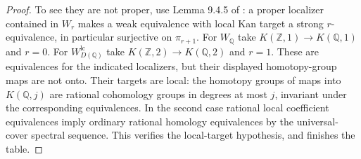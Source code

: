 \begin{proof}
To see they are not proper, use Lemma 9.4.5 of \citet{RCisinski2006}: a proper localizer contained in $W_r$ makes a weak equivalence with local Kan target a strong $r$-equivalence, in particular surjective on $\pi_{r+1}$. For $W_{\mathbb Q}$ take $K(\mathbb Z,1)\to K(\mathbb Q,1)$ and $r=0$. For $W_{D(\mathbb Q)}^{\mathrm{lc}}$ take $K(\mathbb Z,2)\to K(\mathbb Q,2)$ and $r=1$. These are equivalences for the indicated localizers, but their displayed homotopy-group maps are not onto. Their targets are local: the homotopy groups of maps into $K(\mathbb Q,j)$ are rational cohomology groups in degrees at most $j$, invariant under the corresponding equivalences. In the second case rational local coefficient equivalences imply ordinary rational homology equivalences by the universal-cover spectral sequence. This verifies the local-target hypothesis, and finishes the table.
\end{proof}
